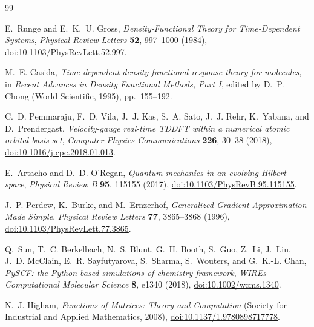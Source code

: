 \documentclass[11pt]{article}
\begin{document}
\begin{thebibliography}{99}

E.~Runge and E.~K.~U. Gross,
\emph{Density-Functional Theory for Time-Dependent Systems},
\emph{Physical Review Letters} \textbf{52}, 997--1000 (1984),
\href{https://doi.org/10.1103/PhysRevLett.52.997}
{doi:10.1103/PhysRevLett.52.997}.

M.~E. Casida,
\emph{Time-dependent density functional response theory for molecules},
in \emph{Recent Advances in Density Functional Methods, Part I},
edited by D.~P. Chong (World Scientific, 1995), pp.~155--192.

C.~D. Pemmaraju, F.~D. Vila, J.~J. Kas, S.~A. Sato, J.~J. Rehr, K.~Yabana,
and D.~Prendergast,
\emph{Velocity-gauge real-time TDDFT within a numerical atomic orbital basis
set},
\emph{Computer Physics Communications} \textbf{226}, 30--38 (2018),
\href{https://doi.org/10.1016/j.cpc.2018.01.013}
{doi:10.1016/j.cpc.2018.01.013}.

E.~Artacho and D.~D. O'Regan,
\emph{Quantum mechanics in an evolving Hilbert space},
\emph{Physical Review B} \textbf{95}, 115155 (2017),
\href{https://doi.org/10.1103/PhysRevB.95.115155}
{doi:10.1103/PhysRevB.95.115155}.

J.~P. Perdew, K.~Burke, and M.~Ernzerhof,
\emph{Generalized Gradient Approximation Made Simple},
\emph{Physical Review Letters} \textbf{77}, 3865--3868 (1996),
\href{https://doi.org/10.1103/PhysRevLett.77.3865}
{doi:10.1103/PhysRevLett.77.3865}.

Q.~Sun, T.~C. Berkelbach, N.~S. Blunt, G.~H. Booth, S.~Guo, Z.~Li,
J.~Liu, J.~D. McClain, E.~R. Sayfutyarova, S.~Sharma, S.~Wouters, and
G.~K.-L. Chan,
\emph{PySCF: the Python-based simulations of chemistry framework},
\emph{WIREs Computational Molecular Science} \textbf{8}, e1340 (2018),
\href{https://doi.org/10.1002/wcms.1340}
{doi:10.1002/wcms.1340}.

N.~J. Higham,
\emph{Functions of Matrices: Theory and Computation}
(Society for Industrial and Applied Mathematics, 2008),
\href{https://doi.org/10.1137/1.9780898717778}
{doi:10.1137/1.9780898717778}.

\end{thebibliography}
\end{document}

